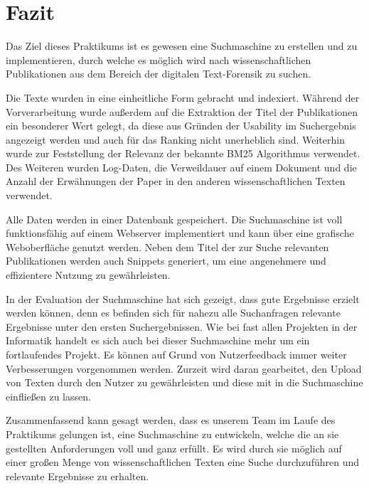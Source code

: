 
\section{Fazit}

Das Ziel dieses Praktikums ist es gewesen eine Suchmaschine zu
erstellen und zu implementieren, durch welche es möglich wird nach
wissenschaftlichen Publikationen aus dem Bereich der digitalen
Text-Forensik zu suchen.

Die Texte wurden in eine einheitliche Form gebracht und
indexiert. Während der Vorverarbeitung wurde außerdem auf die
Extraktion der Titel der Publikationen ein besonderer Wert gelegt, da
diese aus Gründen der Usability im Suchergebnis angezeigt werden und 
auch für das Ranking nicht unerheblich sind. Weiterhin wurde zur
Feststellung der Relevanz der bekannte BM25 Algorithmus
verwendet. Des Weiteren wurden Log-Daten, die Verweildauer auf einem
Dokument und die Anzahl der Erwähnungen der Paper in den anderen
wissenschaftlichen Texten verwendet.

Alle Daten werden in einer Datenbank gespeichert. Die Suchmaschine ist
voll funktionsfähig auf einem Webserver implementiert und kann über
eine grafische Weboberfläche genutzt werden. Neben dem Titel der zur
Suche relevanten Publikationen werden auch Snippets generiert, um eine
angenehmere und effizientere Nutzung zu gewährleisten.

In der Evaluation der Suchmaschine hat sich gezeigt, dass gute
Ergebnisse erzielt werden können, denn es befinden sich für nahezu
alle Suchanfragen relevante Ergebnisse unter den ersten
Suchergebnissen.  Wie bei fast allen Projekten in der Informatik
handelt es sich auch bei dieser Suchmaschine mehr um ein fortlaufendes
Projekt. Es können auf Grund von Nutzerfeedback immer weiter
Verbesserungen vorgenommen werden. Zurzeit wird daran gearbeitet, den
Upload von Texten durch den Nutzer zu gewährleisten und diese mit in
die Suchmaschine einfließen zu lassen.

Zusammenfassend kann gesagt werden, dass es unserem Team im Laufe des
Praktikums gelungen ist, eine Suchmaschine zu entwickeln, welche die
an sie gestellten Anforderungen voll und ganz erfüllt. Es wird durch
sie möglich auf einer großen Menge von wissenschaftlichen Texten eine
Suche durchzuführen und relevante Ergebnisse zu erhalten.

